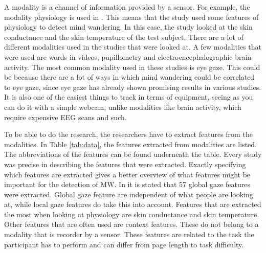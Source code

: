 A modality is a channel of information provided by a sensor. For example, the modality physiology is used in \cite{Blanchard2014AutomatedLearning}. This means that the study used some features of physiology to detect mind wandering. In this case, the study looked at the skin conductance and the skin temperature of the test subject. There are a lot of different modalities used in the studies that were looked at. A few modalities that were used are words in videos, pupillometry and electroencephalographic brain activity. The most common modality used in these studies is eye gaze. This could be because there are a lot of ways in which mind wandering could be correlated to eye gaze, since eye gaze has already shown promising results in various studies. It is also one of the easiest things to track in terms of equipment, seeing as you can do it with a simple webcam, unlike modalities like brain activity, which require expensive EEG scans and such.

To be able to do the research, the researchers have to extract features from the modalities. In Table \ref{tab:data}, the features extracted from modalities are listed. The abbreviations of the features can be found underneath the table. Every study was precise in describing the features that were extracted. Exactly specifying which features are extracted gives a better overview of what features might be important for the detection of MW. In \cite{Hutt2017OutClassroom} it is stated that 57 global gaze features were extracted. Global gaze feature are independent of what people are looking at, while local gaze features do take this into account. Features that are extracted the most when looking at physiology are skin conductance and skin temperature. Other features that are often used are context features. These do not belong to a modality that is recorder by a sensor. These features are related to the task the participant has to perform and can differ from page length to task difficulty.